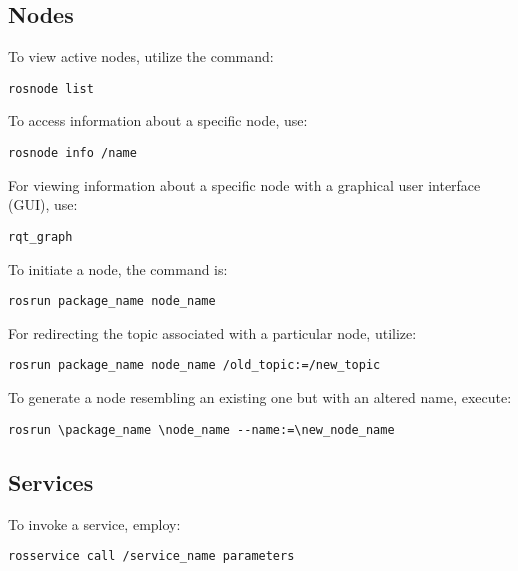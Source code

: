 \subsection{Nodes}
To view active nodes, utilize the command:
\begin{verbatim}
rosnode list
\end{verbatim}
To access information about a specific node, use:
\begin{verbatim}
rosnode info /name
\end{verbatim}
For viewing information about a specific node with a graphical user interface (GUI), use:
\begin{verbatim}
rqt_graph
\end{verbatim}
To initiate a node, the command is:
\begin{verbatim}
rosrun package_name node_name
\end{verbatim}
For redirecting the topic associated with a particular node, utilize:
\begin{verbatim}
rosrun package_name node_name /old_topic:=/new_topic
\end{verbatim}
To generate a node resembling an existing one but with an altered name, execute:
\begin{verbatim}
rosrun \package_name \node_name --name:=\new_node_name
\end{verbatim}

\subsection{Services}
To invoke a service, employ:
\begin{verbatim}
rosservice call /service_name parameters
\end{verbatim}